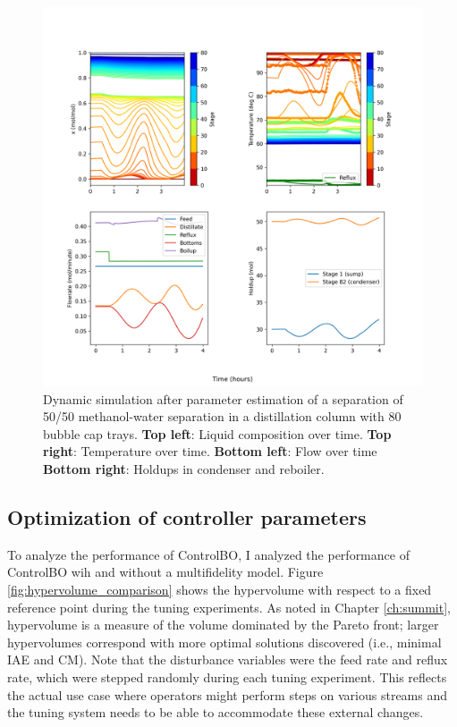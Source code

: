 \begin{figure}
    \centering
    \includegraphics[width=\textwidth]{gfx/Chapter06/2021_11_17_closed_loop_dynamic.png}
    \caption{Dynamic simulation after parameter estimation of a separation of 50/50 methanol-water separation in a distillation column with 80 bubble cap trays. \textbf{Top left}: Liquid composition over time. \textbf{Top right}: Temperature over time. \textbf{Bottom left}: Flow over time \textbf{Bottom right}: Holdups in condenser and reboiler.}
    \label{fig:dynamic_nominal}
\end{figure}

\subsection{Optimization of controller parameters}

To analyze the performance of ControlBO, I analyzed the performance of ControlBO wih and without a multifidelity model.  Figure \ref{fig:hypervolume_comparison} shows the hypervolume with respect to a fixed reference point during the tuning experiments. As noted in Chapter \ref{ch:summit}, hypervolume is a measure of the volume dominated by the Pareto front; larger hypervolumes correspond with more optimal solutions discovered (i.e., minimal IAE and CM). Note that the disturbance variables were the feed rate and reflux rate, which were stepped randomly during each tuning experiment. This reflects the actual use case where operators might perform steps on various streams and the tuning system needs to be able to accommodate these external changes. 

